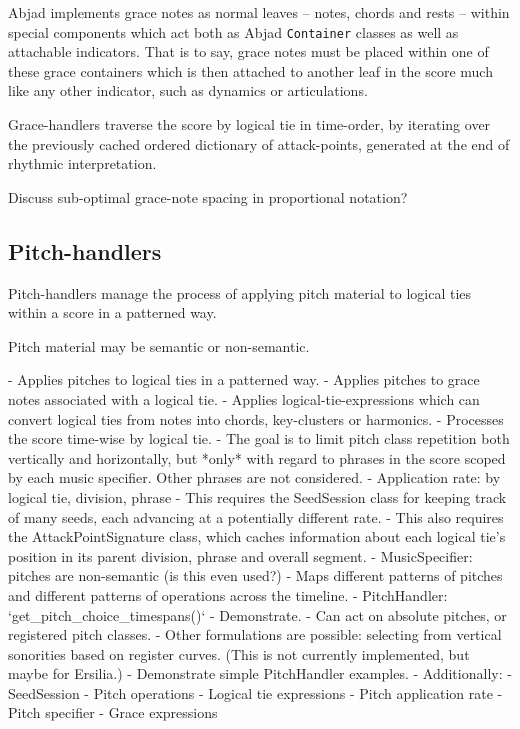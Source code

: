 Abjad implements grace notes as normal leaves -- notes, chords and rests --
within special components which act both as Abjad \texttt{Container} classes as
well as attachable indicators. That is to say, grace notes must be placed
within one of these grace containers which is then attached to another leaf in
the score much like any other indicator, such as dynamics or articulations.

Grace-handlers traverse the score by logical tie in time-order, by iterating
over the previously cached ordered dictionary of attack-points, generated at
the end of rhythmic interpretation.

Discuss sub-optimal grace-note spacing in proportional notation?

\subsection{Pitch-handlers}
\label{ssec:pitch-handlers}

Pitch-handlers manage the process of applying pitch material to logical ties
within a score in a patterned way.

Pitch material may be semantic or non-semantic.

\begin{markdown}
-   Applies pitches to logical ties in a patterned way.
-   Applies pitches to grace notes associated with a logical tie.
-   Applies logical-tie-expressions which can convert logical ties from
    notes into chords, key-clusters or harmonics.
-   Processes the score time-wise by logical tie.
    -   The goal is to limit pitch class repetition both vertically and
        horizontally, but *only* with regard to phrases in the score scoped
        by each music specifier. Other phrases are not considered.
-   Application rate: by logical tie, division, phrase
    -   This requires the SeedSession class for keeping track of many
        seeds, each advancing at a potentially different rate.
    -   This also requires the AttackPointSignature class, which caches
        information about each logical tie's position in its parent
        division, phrase and overall segment.
-   MusicSpecifier: pitches are non-semantic (is this even used?)
-   Maps different patterns of pitches and different patterns of operations
    across the timeline.
    -   PitchHandler: `get_pitch_choice_timespans()`
    -   Demonstrate.
-   Can act on absolute pitches, or registered pitch classes.
-   Other formulations are possible: selecting from vertical sonorities
    based on register curves. (This is not currently implemented, but maybe
    for Ersilia.)
-   Demonstrate simple PitchHandler examples.
-   Additionally:
    -   SeedSession
    -   Pitch operations
    -   Logical tie expressions
    -   Pitch application rate
    -   Pitch specifier
    -   Grace expressions
\end{markdown}

